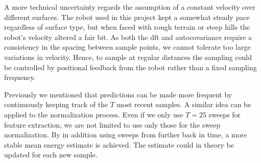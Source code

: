 A more technical uncertainty regards the assumption of a constant velocity over different surfaces. The robot used in this project kept a somewhat steady pace regardless of surface type, but when faced with rough terrain or steep hills the robot's velocity altered a fair bit. As both the \gls{dft} and autocovariance require a consistency in the spacing between sample points, we cannot tolerate too large variations in velocity. Hence, to sample at regular distances the sampling could be controlled by positional feedback from the robot rather than a fixed sampling frequency.

Previously we mentioned that predictions can be made more frequent by continuously keeping track of the $T$ most recent samples. A similar idea can be applied to the normalization process. Even if we only use $T=25$ sweeps for feature extraction, we are not limited to use only those for the sweep normalization. By in addition using sweeps from further back in time, a more stable mean energy estimate is achieved. The estimate could in theory be updated for each new sample.






